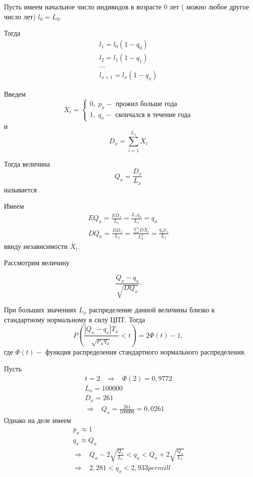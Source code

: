 \begin{definition}
	Пусть имеем начальное число индивидов в возрасте 0 лет ( можно любое другое число лет) $ l_0 = L_0$.

	Тогда 
	\begin{gather*}
		l_1 = l_0(1-q_0)\\
		l_2 = l_1(1-q_1)\\
		...\\
		l_{x+1}=l_x(1-q_x)
	\end{gather*}

	Введем 
	\[\overline{X}_i=
		\begin{cases}
			0, \; p_x - \text{ прожил больше года}\\
			1, \; q_x - \text{ скончался в течение года}
		\end{cases}
	\]
	и 
	\[
		D_x = \sum\limits^{L_x}_{i=1}\overline{X}_i
	\]

	Тогда величина
	\[Q_x = \frac{D_x}{L_x}\]
	называется .
\end{definition}

\begin{clair}
Имеем
	\begin{gather*}
		EQ_x = \frac{ED_x}{L_x} = \frac{L_xq_x}{L_x} = q_x\\
		DQ_x = \frac{DD_x}{L_x} = \frac{\sum D\overline{X}_i}{L^2_x} = \frac{q_xp_x}{L_x}
	\end{gather*}
ввиду независимости $ \overline{X}_i $. 
\end{clair}

Рассмотрим величину

\[ \frac{Q_x - q_x}{\sqrt{DQ_x}}.\]

При больших значениях $ L_x$ распределение данной величины близко к стандартному нормальному в силу ЦПТ. Тогда
\[ P(\frac{|Q_x - q_x|T_x}{\sqrt{p_xq_x}} < t) = 2\Phi(t) -1, \]
где $ \Phi(t)-$ функция распределения стандартного нормального распределения.

\begin{example}
	Пусть 
	\begin{gather*}
		t = 2\;\;\; \Rightarrow \;\;\; \Phi(2) = 0,9772\\
		L_x = 100000\\
		D_x = 261\\
		\Rightarrow\;\;\; Q_x = \frac{261}{100000} = 0,0261
	\end{gather*}
	Однако на деле имеем
	\begin{gather*}
		p_x \approx 1\\
		q_x \approx Q_x\\
		\Rightarrow \;\;\; Q_x - 2 \sqrt{\frac{Q_x}{L_x}} < q_x < Q_x + 2\sqrt{\frac{Q_x}{L_x}}\\
		\Rightarrow\;\;\; 2,281 < q_x < 2,933 permill
	\end{gather*}
\end{example}

